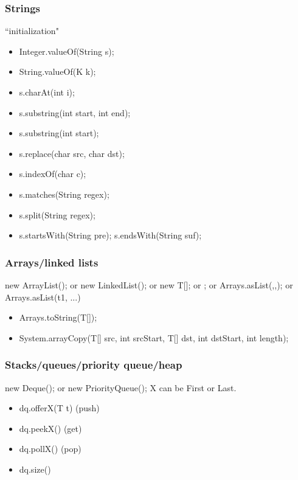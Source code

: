 \documentclass[10pt]{article}
\begin{document}
\subsubsection{Strings}
``initialization"
\begin{itemize}
    \item Integer.valueOf(String s);
    \item String.valueOf(K k);
    \item s.charAt(int i);
    \item s.substring(int start, int end);
    \item s.substring(int start);
    \item s.replace(char src, char dst);
    \item s.indexOf(char c);
    \item s.matches(String regex);
    \item s.split(String regex);
    \item s.startsWith(String pre); s.endsWith(String suf);
\end{itemize}
\subsubsection{Arrays/linked lists}
new ArrayList(); or new LinkedList(); or new T[]; or {}; or Arrays.asList(,,); or Arrays.asList(t1, ...)
\begin{itemize}
    \item Arrays.toString(T[]);
    \item System.arrayCopy(T[] src, int srcStart, T[] dst, int dstStart, int length);
\end{itemize}
\subsubsection{Stacks/queues/priority queue/heap}
new Deque(); or new PriorityQueue();
X can be First or Last.
\begin{itemize}
    \item dq.offerX(T t) (push)
    \item dq.peekX() (get)
    \item dq.pollX() (pop)
    \item dq.size()
\end{itemize}
\end{document}

